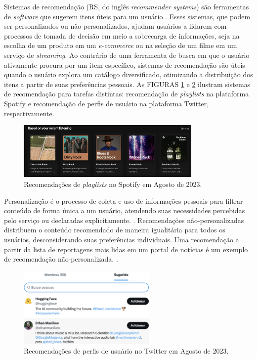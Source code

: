 Sistemas de recomendação (RS, do inglês \textit{recommender systems}) são
ferramentas de \textit{software} que sugerem itens úteis para um usuário
\cite{ricci2010introduction}. Esses sistemas, que podem ser personalizados ou
não-personalizados, ajudam usuários a lidarem com processos de tomada de decisão
em meio a sobrecarga de informações, seja na escolha de um produto em um
\textit{e-commerce} ou na seleção de um filme em um serviço de
\textit{streaming}. Ao contrário de uma ferramenta de busca em que o usuário
ativamente procura por um item específico, sistemas de recomendação são úteis
quando o usuário explora um catálogo diversificado, otimizando a distribuição
dos itens a partir de suas preferências pessoais. As FIGURAS \ref{fig:spotify} e
\ref{fig:twitter} ilustram sistemas de recomendação para tarefas distintas:
recomendação de \textit{playlists} na plataforma Spotify e recomendação de
perfis de usuário na plataforma Twitter, respectivamente.


\begin{figure}[ht]
    \centering
    \includegraphics[width=0.8\textwidth]{chapters/chap01/images/spotify.png}
    \caption{Recomendações de \textit{playlists} no Spotify em Agosto de 2023.}
    \label{fig:spotify}
\end{figure}


Personalização é o processo de coleta e uso de informações pessoais para filtrar
conteúdo de forma única a um usuário, atendendo suas necessidades percebidas
pelo serviço ou declaradas explicitamente. \cite{liang2006personalized}.
Recomendações não-personalizadas distribuem o conteúdo recomendado de maneira
igualitária para todos os usuários, desconsiderando suas preferências
individuais. Uma recomendação a partir da lista de reportagens mais lidas em um
portal de notícias é um exemplo de recomendação não-personalizada.
\cite{falk2019practical}.

\begin{figure}[ht]
    \centering
    \includegraphics[width=0.6\textwidth]{chapters/chap01/images/tt.png}
    \caption{Recomendações de perfis de usuário no Twitter em Agosto de 2023.}
    \label{fig:twitter}
\end{figure}

